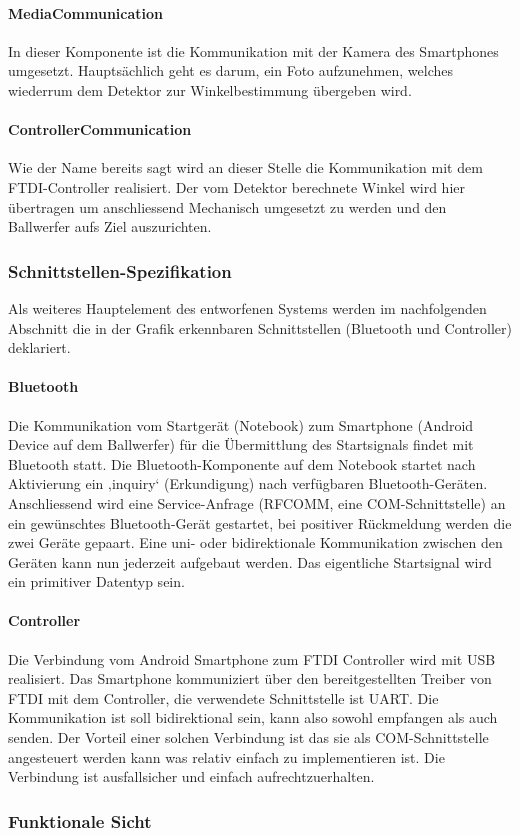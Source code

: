 		\paragraph{MediaCommunication}
		In dieser Komponente ist die Kommunikation mit der Kamera des Smartphones umgesetzt. Hauptsächlich geht es darum, ein Foto aufzunehmen, welches wiederrum dem Detektor zur Winkelbestimmung übergeben wird.
		
		\paragraph{ControllerCommunication}
		Wie der Name bereits sagt wird an dieser Stelle die Kommunikation mit dem FTDI-Controller realisiert. Der vom Detektor berechnete Winkel wird hier übertragen um anschliessend Mechanisch umgesetzt zu werden und den Ballwerfer aufs Ziel auszurichten.
		
	\subsubsection{Schnittstellen-Spezifikation}
		Als weiteres Hauptelement des entworfenen Systems werden im nachfolgenden Abschnitt die in der Grafik erkennbaren Schnittstellen (Bluetooth und Controller) deklariert.
		
		\paragraph{Bluetooth}
		Die Kommunikation vom Startgerät (Notebook) zum Smartphone (Android Device auf dem Ballwerfer) für die Übermittlung des Startsignals findet mit Bluetooth statt. Die Bluetooth-Komponente auf dem Notebook startet nach Aktivierung ein ‚inquiry‘ (Erkundigung) nach verfügbaren Bluetooth-Geräten. Anschliessend wird eine Service-Anfrage (RFCOMM, eine COM-Schnittstelle) an ein gewünschtes Bluetooth-Gerät gestartet, bei positiver Rückmeldung werden die zwei Geräte gepaart. Eine uni- oder bidirektionale Kommunikation zwischen den Geräten kann nun jederzeit aufgebaut werden. Das eigentliche Startsignal wird ein primitiver Datentyp sein.
		
		\paragraph{Controller}
		Die Verbindung vom Android Smartphone zum FTDI Controller wird mit USB realisiert. 
		Das Smartphone kommuniziert über den bereitgestellten Treiber von FTDI mit dem Controller, die verwendete Schnittstelle ist UART. Die Kommunikation ist soll bidirektional sein, kann also sowohl empfangen als auch senden. Der Vorteil einer solchen Verbindung ist das sie als COM-Schnittstelle angesteuert werden kann was relativ einfach zu implementieren ist. Die Verbindung ist ausfallsicher und einfach aufrechtzuerhalten.		
		
	\subsubsection{Funktionale Sicht}
